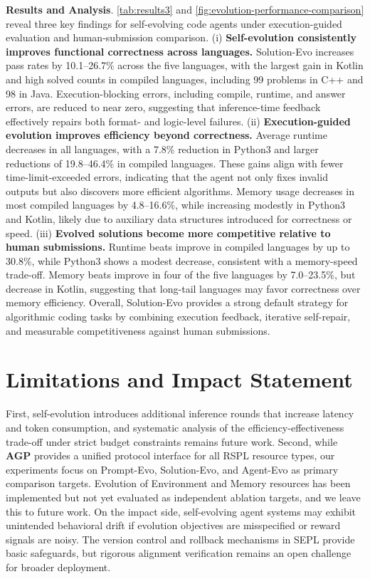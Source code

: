 \documentclass{article}
\theoremstyle{plain}
\theoremstyle{definition}
\theoremstyle{remark}
\newcommand{\projectname}{\textbf{\textsc{AGP}}\xspace}
\begin{document}
\textbf{Results and Analysis}. \cref{tab:results3} and \cref{fig:evolution-performance-comparison} reveal three key findings for self-evolving code agents under execution-guided evaluation and human-submission comparison. (i) \textbf{Self-evolution consistently improves functional correctness across languages.} Solution-Evo increases pass rates by 10.1--26.7\% across the five languages, with the largest gain in Kotlin and high solved counts in compiled languages, including 99 problems in C++ and 98 in Java. Execution-blocking errors, including compile, runtime, and answer errors, are reduced to near zero, suggesting that inference-time feedback effectively repairs both format- and logic-level failures. (ii) \textbf{Execution-guided evolution improves efficiency beyond correctness.} Average runtime decreases in all languages, with a 7.8\% reduction in Python3 and larger reductions of 19.8--46.4\% in compiled languages. These gains align with fewer time-limit-exceeded errors, indicating that the agent not only fixes invalid outputs but also discovers more efficient algorithms. Memory usage decreases in most compiled languages by 4.8--16.6\%, while increasing modestly in Python3 and Kotlin, likely due to auxiliary data structures introduced for correctness or speed. (iii) \textbf{Evolved solutions become more competitive relative to human submissions.} Runtime beats improve in compiled languages by up to 30.8\%, while Python3 shows a modest decrease, consistent with a memory-speed trade-off. Memory beats improve in four of the five languages by 7.0--23.5\%, but decrease in Kotlin, suggesting that long-tail languages may favor correctness over memory efficiency. Overall, Solution-Evo provides a strong default strategy for algorithmic coding tasks by combining execution feedback, iterative self-repair, and measurable competitiveness against human submissions.

\vspace{-0.2cm}
\section{Limitations and Impact Statement}
\vspace{-0.2cm}
\label{sec:limitation}

First, self-evolution introduces additional inference rounds that increase latency and token consumption, and systematic analysis of the efficiency-effectiveness trade-off under strict budget constraints remains future work. Second, while \projectname provides a unified protocol interface for all RSPL resource types, our experiments focus on Prompt-Evo, Solution-Evo, and Agent-Evo as primary comparison targets. Evolution of Environment and Memory resources has been implemented but not yet evaluated as independent ablation targets, and we leave this to future work. On the impact side, self-evolving agent systems may exhibit unintended behavioral drift if evolution objectives are misspecified or reward signals are noisy. The version control and rollback mechanisms in SEPL provide basic safeguards, but rigorous alignment verification remains an open challenge for broader deployment.
\end{document}

